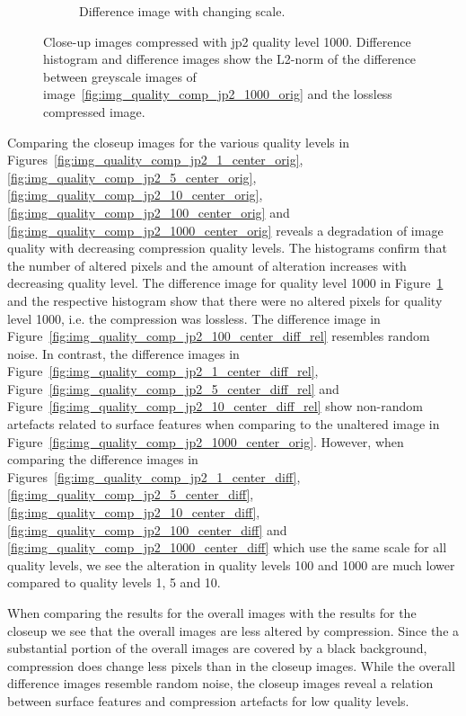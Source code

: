 \begin{figure}[htb]
\begin{subfigure}[b]{0.48\textwidth}
        \caption{Difference image with changing scale.}
        \label{fig:img_quality_comp_jp2_1000_center_diff_rel}
    \end{subfigure}
    \caption{Close-up images compressed with \gls{jp2} quality level 1000. Difference histogram and difference images show the L2-norm of the difference between greyscale images of image~\ref{fig:img_quality_comp_jp2_1000_orig} and the lossless compressed image.}
    \label{fig:img_quality_comp_jp2_1000_center}
\end{figure}

Comparing the closeup images for the various quality levels in Figures~\ref{fig:img_quality_comp_jp2_1_center_orig}, \ref{fig:img_quality_comp_jp2_5_center_orig}, \ref{fig:img_quality_comp_jp2_10_center_orig}, \ref{fig:img_quality_comp_jp2_100_center_orig} and \ref{fig:img_quality_comp_jp2_1000_center_orig} reveals a degradation of image quality with decreasing compression quality levels. The histograms confirm that the number of altered pixels and the amount of alteration increases with decreasing quality level. The difference image for quality level 1000 in Figure~\ref{fig:img_quality_comp_jp2_1000_center_diff_rel} and the respective histogram show that there were no altered pixels for quality level 1000, i.e. the compression was lossless. The difference image in Figure~\ref{fig:img_quality_comp_jp2_100_center_diff_rel} resembles random noise. In contrast, the difference images in Figure~\ref{fig:img_quality_comp_jp2_1_center_diff_rel}, Figure~\ref{fig:img_quality_comp_jp2_5_center_diff_rel} and Figure~\ref{fig:img_quality_comp_jp2_10_center_diff_rel} show non-random artefacts related to surface features when comparing to the unaltered image in Figure~\ref{fig:img_quality_comp_jp2_1000_center_orig}. However, when comparing the difference images in Figures~\ref{fig:img_quality_comp_jp2_1_center_diff}, \ref{fig:img_quality_comp_jp2_5_center_diff}, \ref{fig:img_quality_comp_jp2_10_center_diff}, \ref{fig:img_quality_comp_jp2_100_center_diff} and \ref{fig:img_quality_comp_jp2_1000_center_diff} which use the same scale for all quality levels, we see the alteration in quality levels \SI{100}{} and \SI{1000}{} are much lower compared to quality levels \SI{1}{}, \SI{5}{} and \SI{10}{}.

When comparing the results for the overall images with the results for the closeup we see that the overall images are less altered by compression. Since the a substantial portion of the  overall images are covered by a black background, compression does change less pixels than in the closeup images. While the overall difference images resemble random noise, the closeup images reveal a relation between surface features and compression artefacts for low quality levels.

